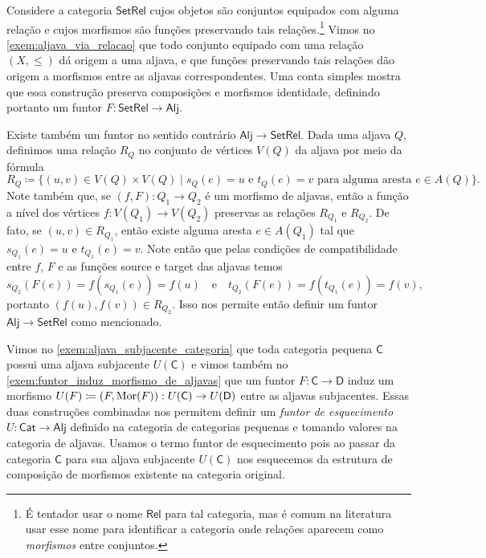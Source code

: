 \begin{exem}
    Considere a categoria $\mathsf{SetRel}$ cujos objetos são conjuntos equipados com alguma relação e cujos morfismos são funções preservando tais relações.\footnote{É tentador usar o nome $\mathsf{Rel}$ para tal categoria, mas é comum na literatura usar esse nome para identificar a categoria onde relações aparecem como \emph{morfismos} entre conjuntos.}
    Vimos no \cref{exem:aljava_via_relacao} que todo conjunto equipado com uma relação $(X,\leq)$ dá origem a uma aljava, e que funções preservando tais relações dão origem a morfismos entre as aljavas correspondentes.
    Uma conta simples mostra que essa construção preserva composições e morfismos identidade, definindo portanto um funtor $F: \mathsf{SetRel} \to \mathsf{Alj}$.

    Existe também um funtor no sentido contrário $\mathsf{Alj} \to \mathsf{SetRel}$.
    Dada uma aljava $Q$, definimos uma relação $R_Q$ no conjunto de vértices $V(Q)$ da aljava por meio da fórmula
    \begin{displaymath}
        R_Q \coloneqq \{(u,v) \in V(Q) \times V(Q) \mid s_Q(e) = u \text{ e } t_Q(e) = v \text{ para alguma aresta } e \in A(Q)\}.
    \end{displaymath}
    Note também que, se $(f,F): Q_1 \to Q_2$ é um morfismo de aljavas, então a função a nível dos vértices $f: V(Q_1) \to V(Q_2)$ preservas as relações $R_{Q_1}$ e $R_{Q_2}$.
    De fato, se $(u,v) \in R_{Q_1}$, então existe alguma aresta $e \in A(Q_1)$ tal que $s_{Q_1}(e) = u$ e $t_{Q_1}(e) = v$.
    Note então que pelas condições de compatibilidade entre $f$, $F$ e as funções source e target das aljavas temos
    \begin{displaymath}
        s_{Q_2}(F(e)) = f(s_{Q_1}(e)) = f(u)
        \quad \text{e} \quad
        t_{Q_2}(F(e)) = f(t_{Q_1}(e)) = f(v),
    \end{displaymath}
    portanto $(f(u),f(v)) \in R_{Q_2}$.
    Isso nos permite então definir um funtor $\mathsf{Alj} \to \mathsf{SetRel}$ como mencionado.
\end{exem}

\begin{exem}\label{exem:funtor_esquecimento_cat_aljava}
    Vimos no \cref{exem:aljava_subjacente_categoria} que toda categoria pequena $\mathsf{C}$ possui uma aljava subjacente $U(\mathsf{C})$ e vimos também no \cref{exem:funtor_induz_morfismo_de_aljavas} que um funtor $F: \mathsf{C} \to \mathsf{D}$ induz um morfismo $U(F) \coloneqq (F,\mathrm{Mor}(F)): U(\mathsf{C}) \to U(\mathsf{D})$ entre as aljavas subjacentes.
    Essas duas construções combinadas nos permitem definir um \emph{funtor de esquecimento} $U: \mathsf{Cat} \to \mathsf{Alj}$ definido na categoria de categorias pequenas e tomando valores na categoria de aljavas.
    Usamos o termo funtor de esquecimento pois ao passar da categoria $\mathsf{C}$ para sua aljava subjacente $U(\mathsf{C})$ nos esquecemos da estrutura de composição de morfismos existente na categoria original.
\end{exem}

